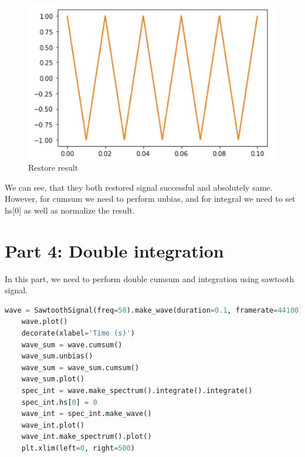 \documentclass[a4paper]{article}
\begin{document}
        \begin{figure}[H]
            \centering
            \includegraphics[width=\textwidth]{img/p3_1.png}
            \caption{Restore result}
            \label{fig:part1_1_2}
        \end{figure}
        
        We can see, that they both restored signal successful and absolutely same. However, for cumsum we need to perform unbias, and for integral we need to set hs[0] as well as normalize the result.
        
    \newpage
        \section{Part 4: Double integration}
        
        In this part, we need to perform double cumsum and integration using sawtooth signal.
            
        \begin{lstlisting}[language=Python,caption=Double integration,label={lst:part1_2}]
    wave = SawtoothSignal(freq=50).make_wave(duration=0.1, framerate=44100)
    wave.plot()
    decorate(xlabel='Time (s)')
    wave_sum = wave.cumsum()
    wave_sum.unbias()
    wave_sum = wave_sum.cumsum()
    wave_sum.plot()
    spec_int = wave.make_spectrum().integrate().integrate()
    spec_int.hs[0] = 0
    wave_int = spec_int.make_wave()
    wave_int.plot()
    wave_int.make_spectrum().plot()
    plt.xlim(left=0, right=500)
        \end{lstlisting}
        
\end{document}
